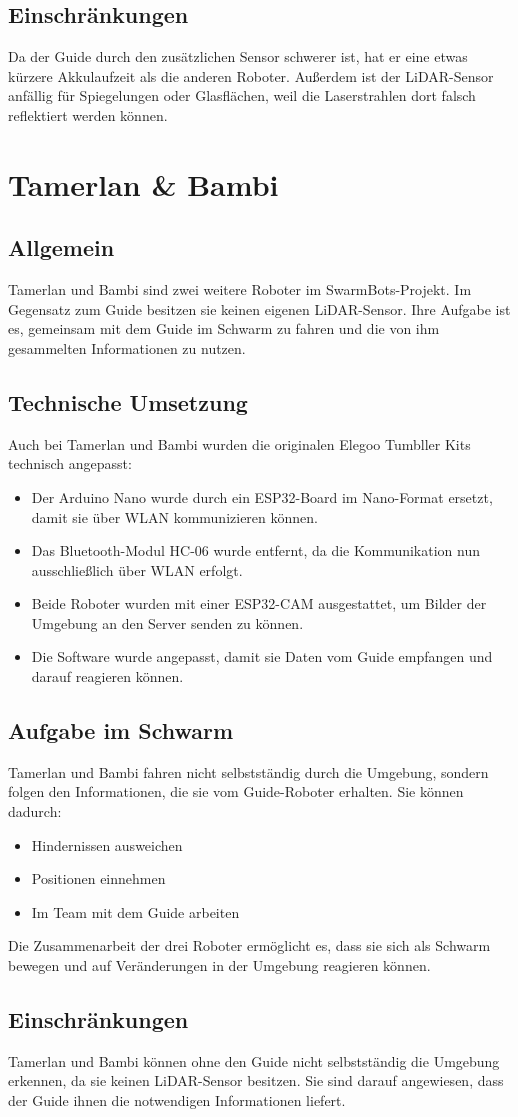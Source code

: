 \subsection{Einschränkungen}
Da der Guide durch den zusätzlichen Sensor schwerer ist, hat er eine etwas kürzere Akkulaufzeit als die anderen Roboter. Außerdem ist der LiDAR-Sensor anfällig für Spiegelungen oder Glasflächen, weil die Laserstrahlen dort falsch reflektiert werden können.

%
\section{Tamerlan \& Bambi}
\label{subsec:hardware_tamerlan_bambi}

\subsection{Allgemein}
Tamerlan und Bambi sind zwei weitere Roboter im SwarmBots-Projekt.
Im Gegensatz zum Guide besitzen sie keinen eigenen LiDAR-Sensor. Ihre Aufgabe ist es, gemeinsam mit dem Guide im Schwarm zu fahren und die von ihm gesammelten Informationen zu nutzen.
%
\subsection{Technische Umsetzung}
Auch bei Tamerlan und Bambi wurden die originalen Elegoo Tumbller Kits technisch angepasst:
\begin{itemize}
    \item Der Arduino Nano wurde durch ein ESP32-Board im Nano-Format ersetzt, damit sie über WLAN kommunizieren können.
    \item Das Bluetooth-Modul HC-06 wurde entfernt, da die Kommunikation nun ausschließlich über WLAN erfolgt.
    \item Beide Roboter wurden mit einer ESP32-CAM ausgestattet, um Bilder der Umgebung an den Server senden zu können.
    \item Die Software wurde angepasst, damit sie Daten vom Guide empfangen und darauf reagieren können.
\end{itemize}
%
\subsection{Aufgabe im Schwarm}
Tamerlan und Bambi fahren nicht selbstständig durch die Umgebung, sondern folgen den Informationen, die sie vom Guide-Roboter erhalten.
Sie können dadurch:
\begin{itemize}
    \item Hindernissen ausweichen
    \item Positionen einnehmen
    \item Im Team mit dem Guide arbeiten
\end{itemize}
Die Zusammenarbeit der drei Roboter ermöglicht es, dass sie sich als Schwarm bewegen und auf Veränderungen in der Umgebung reagieren können.
%
\subsection{ Einschränkungen}
Tamerlan und Bambi können ohne den Guide nicht selbstständig die Umgebung erkennen, da sie keinen LiDAR-Sensor besitzen. Sie sind darauf angewiesen, dass der Guide ihnen die notwendigen Informationen liefert.